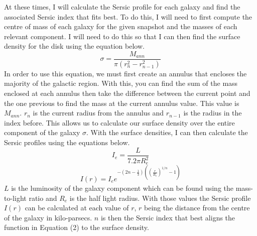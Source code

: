 \documentclass[linenumbers,trackchanges]{aastex7}
\begin{document}
At these times, I will calculate the Sersic profile for each galaxy
and find the associated Sersic index that fits best. To do this, I
will need to first compute the centre of mass of each galaxy for the
given snapshot and the masses of each relevant component. I will need
to do this so that I can then find the surface density for the disk
using the equation below.
\begin{equation}
\sigma=\frac{M_{ann}}{\pi(r_n^2-r_{n-1}^2)}
\end{equation}
In order to use this equation, we must first create an annulus that
encloses the majority of the galactic region. With this, you can find
the sum of the mass enclosed at each annulus then take the difference
between the current point and the one previous to find the mass at the
current annulus value. This value is \begin{math}M_{ann}\end{math}.
\begin{math}r_{n}\end{math} is the current radius from the annulus and
\begin{math}r_{n-1}\end{math} is the radius in the index before. This
allows us to calculate our surface density over the entire component of
the galaxy \begin{math}\sigma\end{math}. With the surface densities, I
can then calculate the Sersic profiles using the equations below.
\begin{equation}
I_e=\frac{L}{7.2\pi R_e^2}
\end{equation}
\begin{equation}
I(r)=I_ee^{-(2n-\frac{1}{3})((\frac{r}{R_e})^{1/n}-1)}
\end{equation}
\begin{math}L\end{math} is the luminosity of the galaxy component which
can be found using the mass-to-light ratio and
\begin{math}R_e\end{math} is the half light radius. With those values
the Sersic profile \begin{math}I(r)\end{math} can be calculated at
each value of \begin{math}r\end{math}, \begin{math}r\end{math} being
the distance from the centre of the galaxy in kilo-parsecs.
\begin{math}n\end{math} is then the Sersic index that best aligns the
function in Equation (2) to the surface density.
\end{document}
